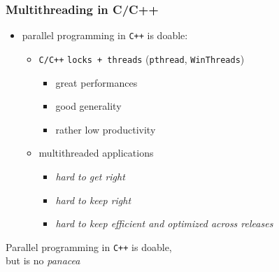 \documentclass[9pt]{beamer}
\newcommand{\mypurple}[1]{{\color[rgb]{0.7,0,0.8}#1}}
\newcommand{\myred}  [1] {{\color{red}#1}}
\begin{document}
\begin{frame}[fragile]
\frametitle{Multithreading in C/C++}


\begin{itemize}
\item parallel programming in \texttt{C++} is \myred{doable}:
\begin{itemize}
\item \verb~C/C++~ \mypurple{\texttt{locks + threads}} (\verb~pthread~,
    \verb~WinThreads~)
\begin{itemize}
\item great performances
\item good generality
\item rather \myred{low productivity}
\end{itemize}
\item multithreaded applications
\begin{itemize}
\item \emph{hard to get right}
\item \emph{hard to \myred{keep} right}
\item \emph{hard to \myred{keep} efficient and optimized across
      releases}
\end{itemize}
\end{itemize}
\end{itemize}

\begin{block}{}

  \begin{center}
 Parallel programming in \texttt{C++} is \alert{doable}, \\
 but \alert{is no \emph{panacea}}
 \end{center}
\end{block}
\end{frame}
\end{document}
